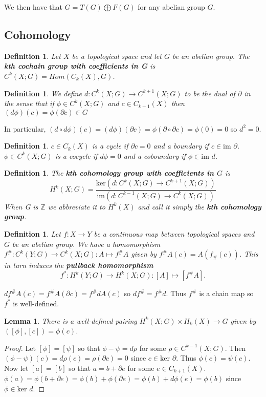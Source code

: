 \documentclass{article}
\newtheorem{definition}[theorem]{Definition}
\newtheorem{lemma}[theorem]{Lemma}
\begin{document}
\noindent We then have that $G=T(G)\bigoplus F(G)$ for any abelian group $G$.

\subsection{Cohomology}
\begin{definition}
Let $X$ be a topological space and let $G$ be an abelian group. The \textbf{kth cochain group with coefficients in G} is $C^k(X;G)=Hom(C_k(X),G)$. 
\end{definition}

\begin{definition}
We define $d\colon C^k(X;G)\to C^{k+1}(X;G)$ to be the dual of $\partial$ in the sense that if $\phi\in C^k(X;G)$ and $c\in C_{k+1}(X)$ then $(d\phi)(c)=\phi(\partial c)\in G$
\end{definition}

\noindent In particular, $(d\circ d\phi)(c)=(d\phi)(\partial c)=\phi(\partial\circ\partial c)=\phi(0)=0$ so $d^2=0$.

\begin{definition}
$c\in C_k(X)$ is a cycle if $\partial c=0$ and a boundary if $c\in\text{im }\partial$.
$\phi\in C^k(X;G)$ is a cocycle if $d\phi=0$ and a coboundary if $\phi\in\text{im }d$.
\end{definition}

\begin{definition}
The \textbf{kth cohomology group with coefficients in $G$} is \[H^k(X;G)=\frac{\text{ker}(d\colon C^k(X;G)\to C^{k+1}(X;G))}{\text{im}(d\colon C^{k-1}(X;G)\to C^k(X;G))}\] When G is $\mathbb{Z}$ we abbreviate it to $H^k(X)$ and call it simply the \textbf{kth cohomology group}.
\end{definition}

\begin{definition}
Let $f\colon X\to Y$ be a continuous map between topological spaces and $G$ be an abelian group. We have a homomorphism $f^\#\colon C^k(Y;G)\to C^k(X;G):A\mapsto f^\# A$ given by $f^\# A(c)=A(f_\#(c))$. This in turn induces the \textbf{pullback homomorphism} \[f^*\colon H^k(Y;G)\to H^k(X;G):[A]\mapsto [f^\# A].\]
\end{definition}
\noindent $df^\# A(c)=f^\# A(\partial c)=f^\# dA(c)$ so $df^\#=f^\# d$. Thus $f^\#$ is a chain map so $f^*$ is well-defined.

\begin{lemma}
There is a well-defined pairing $H^k(X;G)\times H_k(X)\to G$ given by $([\phi],[c])=\phi(c)$.
\end{lemma}
\begin{proof}
Let $[\phi]=[\psi]$ so that $\phi-\psi=d\rho$ for some $\rho\in C^{k-1}(X;G)$. Then $(\phi-\psi)(c)=d\rho(c)=\rho(\partial c)=0$ since $c\in\text{ker }\partial$. Thus $\phi(c)=\psi(c)$.
Now let $[a]=[b]$ so that $a=b+\partial e$ for some $e\in C_{k+1}(X)$. $\phi(a)=\phi(b+\partial e)=\phi(b)+\phi(\partial e)=\phi(b)+d\phi(e)=\phi(b)$ since $\phi\in\text{ker }d$.
\end{proof}
\end{document}
